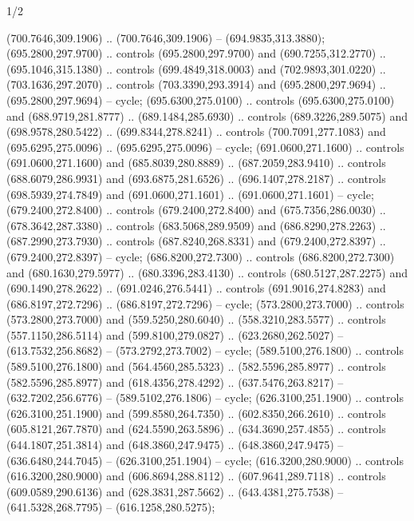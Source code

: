 \begin{flagdescription}{1/2}
\begin{scope}[xshift=0.5\flaglength,yshift=0.5\flagwidth,scale=\flagwidth/759]
\begin{scope}[y=0.8pt, x=0.8pt, yscale=-1,shift={(-720,-480)}]
\begin{scope}[draw=black,fill=c452c25,line width=0.438\lw]
  (700.7646,309.1906) .. (700.7646,309.1906) -- (694.9835,313.3880);
 (695.2800,297.9700) .. controls (695.2800,297.9700) and
  (690.7255,312.2770) .. (695.1046,315.1380) .. controls (699.4849,318.0003) and
  (702.9893,301.0220) .. (703.1636,297.2070) .. controls (703.3390,293.3914) and
  (695.2800,297.9694) .. (695.2800,297.9694) -- cycle;
 (695.6300,275.0100) .. controls (695.6300,275.0100) and
  (688.9719,281.8777) .. (689.1484,285.6930) .. controls (689.3226,289.5075) and
  (698.9578,280.5422) .. (699.8344,278.8241) .. controls (700.7091,277.1083) and
  (695.6295,275.0096) .. (695.6295,275.0096) -- cycle;
 (691.0600,271.1600) .. controls (691.0600,271.1600) and
  (685.8039,280.8889) .. (687.2059,283.9410) .. controls (688.6079,286.9931) and
  (693.6875,281.6526) .. (696.1407,278.2187) .. controls (698.5939,274.7849) and
  (691.0600,271.1601) .. (691.0600,271.1601) -- cycle;
 (679.2400,272.8400) .. controls (679.2400,272.8400) and
  (675.7356,286.0030) .. (678.3642,287.3380) .. controls (683.5068,289.9509) and
  (686.8290,278.2263) .. (687.2990,273.7930) .. controls (687.8240,268.8331) and
  (679.2400,272.8397) .. (679.2400,272.8397) -- cycle;
 (686.8200,272.7300) .. controls (686.8200,272.7300) and
  (680.1630,279.5977) .. (680.3396,283.4130) .. controls (680.5127,287.2275) and
  (690.1490,278.2622) .. (691.0246,276.5441) .. controls (691.9016,274.8283) and
  (686.8197,272.7296) .. (686.8197,272.7296) -- cycle;
 (573.2800,273.7000) .. controls (573.2800,273.7000) and
  (559.5250,280.6040) .. (558.3210,283.5577) .. controls (557.1150,286.5114) and
  (599.8100,279.0827) .. (623.2680,262.5027) -- (613.7532,256.8682) --
  (573.2792,273.7002) -- cycle;
 (589.5100,276.1800) .. controls (589.5100,276.1800) and
  (564.4560,285.5323) .. (582.5596,285.8977) .. controls (582.5596,285.8977) and
  (618.4356,278.4292) .. (637.5476,263.8217) -- (632.7202,256.6776) --
  (589.5102,276.1806) -- cycle;
 (626.3100,251.1900) .. controls (626.3100,251.1900) and
  (599.8580,264.7350) .. (602.8350,266.2610) .. controls (605.8121,267.7870) and
  (624.5590,263.5896) .. (634.3690,257.4855) .. controls (644.1807,251.3814) and
  (648.3860,247.9475) .. (648.3860,247.9475) -- (636.6480,244.7045) --
  (626.3100,251.1904) -- cycle;
 (616.3200,280.9000) .. controls (616.3200,280.9000) and
  (606.8694,288.8112) .. (607.9641,289.7118) .. controls (609.0589,290.6136) and
  (628.3831,287.5662) .. (643.4381,275.7538) -- (641.5328,268.7795) --
  (616.1258,280.5275);

\end{scope}
\end{scope}
\end{scope}
\end{flagdescription}
